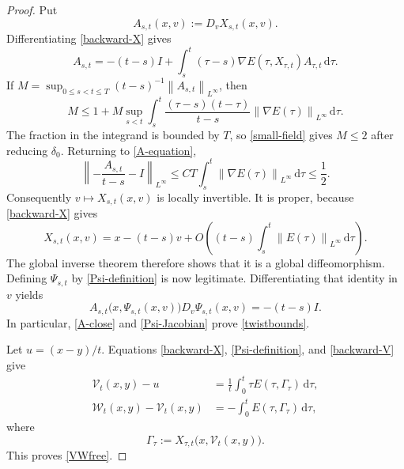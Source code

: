 \documentclass[11pt]{article}
\newcommand{\norm}[1]{\left\lVert #1\right\rVert}
\newcommand{\dd}{\,\mathrm d}
\begin{document}
\begin{proof}
Put
\begin{equation*}
 A_{s,t}(x,v):=D_vX_{s,t}(x,v).
\end{equation*}
Differentiating \eqref{backward-X} gives
\begin{equation}\label{A-equation}
 A_{s,t}=-(t-s)I+
 \int_s^t(\tau-s)\nabla E(\tau,X_{\tau,t})A_{\tau,t}\dd\tau.
\end{equation}
If
 $M=\sup_{0\leq s<t\leq T}(t-s)^{-1}\norm{A_{s,t}}_{L^\infty}$, then
\begin{equation*}
 M\leq1+M\sup_{s<t}\int_s^t
 \frac{(\tau-s)(t-\tau)}{t-s}\norm{\nabla E(\tau)}_{L^\infty}\dd\tau.
\end{equation*} 
The fraction in the integrand is bounded by $T$, so
\eqref{small-field} gives $M\leq2$ after reducing $\delta_0$.  Returning to
\eqref{A-equation},
 \begin{equation}\label{A-close}
 \norm{-\frac{A_{s,t}}{t-s}-I}_{L^\infty}
 \leq C T\int_s^t\norm{\nabla E(\tau)}_{L^\infty}\dd\tau
 \leq\frac{1}{2}.
\end{equation} 
Consequently $v\mapsto X_{s,t}(x,v)$ is locally invertible.  It is proper,
because \eqref{backward-X} gives
 \begin{equation*}
 X_{s,t}(x,v)=x-(t-s)v+
 O\left((t-s)\int_s^t\norm{E(\tau)}_{L^\infty}\dd\tau\right).
\end{equation*} 
The global inverse theorem therefore shows that it is a global
diffeomorphism.  Defining $\Psi_{s,t}$ by \eqref{Psi-definition} is now
legitimate.  Differentiating that identity in $v$ yields
\begin{equation}\label{Psi-Jacobian}
 A_{s,t}\bigl(x,\Psi_{s,t}(x,v)\bigr)
 D_v\Psi_{s,t}(x,v)=-(t-s)I.
\end{equation}
In particular, \eqref{A-close} and \eqref{Psi-Jacobian} prove
\eqref{twistbounds}.

Let $u=(x-y)/t$.  Equations \eqref{backward-X},
\eqref{Psi-definition}, and \eqref{backward-V} give
\begin{align*}
 \mathcal V_t(x,y)-u
 &=\frac{1}{t}\int_0^t\tau E(\tau,\Gamma_\tau)\dd\tau,\\
 \mathcal W_t(x,y)-\mathcal V_t(x,y)
 &=-\int_0^tE(\tau,\Gamma_\tau)\dd\tau,
\end{align*}
where
\begin{equation*}
 \Gamma_\tau
 :=X_{\tau,t}\bigl(x,\mathcal V_t(x,y)\bigr).
\end{equation*}
This proves \eqref{VWfree}.


\end{proof}
\end{document}
